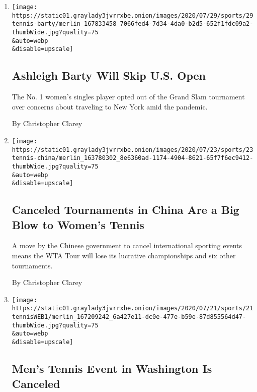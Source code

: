 \begin{enumerate}
\def\labelenumi{\arabic{enumi}.}
\item
  \href{/2020/07/29/sports/tennis/ashleigh-barty-us-open.html}{}

  \texttt{[image: https://static01.graylady3jvrrxbe.onion/images/2020/07/29/sports/29tennis-barty/merlin\_167833458\_7066fed4-7d34-4da0-b2d5-652f1fdc09a2-thumbWide.jpg?quality=75\\\&auto=webp\\\&disable=upscale]}

  \hypertarget{ashleigh-barty-will-skip-us-open}{%
  \subsection{Ashleigh Barty Will Skip U.S.
  Open}\label{ashleigh-barty-will-skip-us-open}}

  The No. 1 women's singles player opted out of the Grand Slam
  tournament over concerns about traveling to New York amid the
  pandemic.

  By Christopher Clarey
\item
  \href{/2020/07/23/sports/tennis/wta-tour-china-tournaments-canceled.html}{}

  \texttt{[image: https://static01.graylady3jvrrxbe.onion/images/2020/07/23/sports/23tennis-china/merlin\_163780302\_8e6360ad-1174-4904-8621-65f7f6ec9412-thumbWide.jpg?quality=75\\\&auto=webp\\\&disable=upscale]}

  \hypertarget{canceled-tournaments-in-china-are-a-big-blow-to-womens-tennis}{%
  \subsection{Canceled Tournaments in China Are a Big Blow to Women's
  Tennis}\label{canceled-tournaments-in-china-are-a-big-blow-to-womens-tennis}}

  A move by the Chinese government to cancel international sporting
  events means the WTA Tour will lose its lucrative championships and
  six other tournaments.

  By Christopher Clarey
\item
  \href{/2020/07/21/sports/citi-open-washington-canceled.html}{}

  \texttt{[image: https://static01.graylady3jvrrxbe.onion/images/2020/07/21/sports/21tennisWEB1/merlin\_167209242\_6a427e11-dc0e-477e-b59e-87d855564d47-thumbWide.jpg?quality=75\\\&auto=webp\\\&disable=upscale]}

  \hypertarget{mens-tennis-event-in-washington-is-canceled}{%
  \subsection{Men's Tennis Event in Washington Is
  Canceled}\label{mens-tennis-event-in-washington-is-canceled}}


\end{enumerate}

